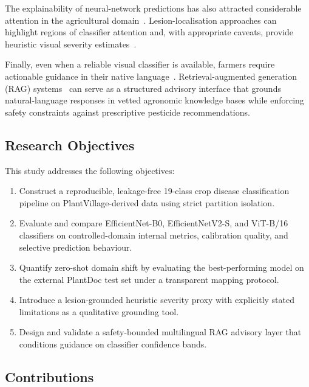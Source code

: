 \documentclass[conference]{IEEEtran}
\begin{document}
The explainability of neural-network predictions has also attracted considerable
attention in the agricultural domain~\cite{selvaraju2017gradcam,chattopadhay2018gradcam++,
lundberg2017shap}. Lesion-localisation approaches can highlight regions of
classifier attention and, with appropriate caveats, provide heuristic visual
severity estimates~\cite{saleem2019plant, albattah2022novel}.

Finally, even when a reliable visual classifier is available, farmers require
actionable guidance in their native language~\cite{sujatha2021performance}.
Retrieval-augmented generation (RAG) systems~\cite{lewis2020retrieval,guu2020retrieval}
can serve as a structured advisory interface that grounds natural-language
responses in vetted agronomic knowledge bases while enforcing safety constraints
against prescriptive pesticide recommendations.

\subsection*{Research Objectives}

This study addresses the following objectives:
\begin{enumerate}
    \item Construct a reproducible, leakage-free 19-class crop disease classification
          pipeline on PlantVillage-derived data using strict partition isolation.
    \item Evaluate and compare EfficientNet-B0, EfficientNetV2-S, and ViT-B/16
          classifiers on controlled-domain internal metrics, calibration quality,
          and selective prediction behaviour.
    \item Quantify zero-shot domain shift by evaluating the best-performing model
          on the external PlantDoc test set under a transparent mapping protocol.
    \item Introduce a lesion-grounded heuristic severity proxy with explicitly
          stated limitations as a qualitative grounding tool.
    \item Design and validate a safety-bounded multilingual RAG advisory layer
          that conditions guidance on classifier confidence bands.
\end{enumerate}

\subsection*{Contributions}
\end{document}
